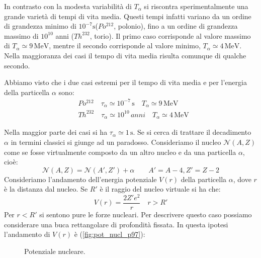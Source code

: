 In contrasto con la modesta variabilità di $T_{\alpha}$ si riscontra
sperimentalmente una grande varietà di tempi di vita media. Questi tempi infatti
variano da un ordine di grandezza minimo di $10^{-7}\si{\second}$($Po^{212}$,
polonio), fino a un ordine di grandezza massimo di $10^{10}$ anni ($Th^{232}$,
torio). Il primo caso corrisponde al valore massimo di $T_{\alpha}\simeq
9\,\si{\mega\electronvolt}$, mentre il secondo corrisponde al valore minimo,
$T_{\alpha}\simeq 4\,\si{\mega\electronvolt}$. Nella maggioranza dei casi il
tempo di vita media risulta comunque di qualche secondo.

\breaknote

Abbiamo visto che i due casi estremi per il tempo di vita
media e per l'energia della particella $\alpha$ sono:
\begin{align*}
&Po^{212}\quad\tau_{\alpha}\simeq 10^{-7}\,\si{\second}\quad T_{\alpha}\simeq 9\,\si{\mega\electronvolt}\\
&Th^{232}\quad\tau_{\alpha}\simeq 10^{10}\,anni\quad T_{\alpha}\simeq 4\,\si{\mega\electronvolt}
\end{align*}

Nella maggior parte dei casi si ha $\tau_{\alpha}\simeq 1\,\si{\second}$. Se si
cerca di trattare il decadimento $\alpha$ in termini classici si giunge ad un
paradosso. Consideriamo il nucleo $\mathcal{N}(A,Z)$ come se fosse virtualmente
composto da un altro nucleo e da una particella $\alpha$, cioè:
\[
\mathcal{N}(A,Z)=\mathcal{N}(A',Z')+\alpha\qquad A'=A-4,Z'=Z-2
\]
Consideriamo l'andamento dell'energia potenziale $V(r)$ della particella
$\alpha$, dove $r$ è la distanza dal nucleo. Se $R'$ è il raggio del nucleo
virtuale si ha che:
\[
V(r)=\frac{2Z'e^2}{r}\quad r>R'
\]
Per $r<R'$ si sentono pure le forze nucleari. Per descrivere questo caso
possiamo considerare una buca rettangolare di profondità fissata. In questa
ipotesi l'andamento di $V(r)$ è (\autoref{fig:pot_nucl_p97}):

\begin{figure}[hbtp]
\centering
\caption{Potenziale nucleare.}
\label{fig:pot_nucl_p97}

\end{figure}

